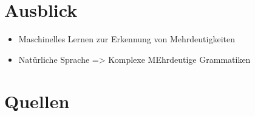 \documentclass[t]{beamer}
\begin{document}
	\section{Ausblick}\label{sec:ausblick-und-zukunftige-projekte}
	\begin{frame}
		\begin{itemize}
			\item Maschinelles Lernen zur Erkennung von Mehrdeutigkeiten
			\item Natürliche Sprache => Komplexe MEhrdeutige Grammatiken
		\end{itemize}
	\end{frame}


	\section{Quellen}\label{sec:quellen}
	\begin{frame}[allowframebreaks]
		
		
	\end{frame}
\end{document}
